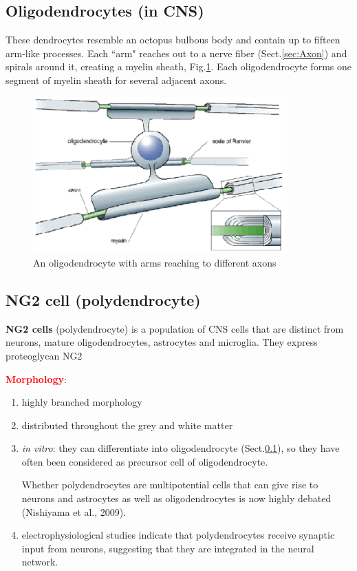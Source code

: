 \subsection{Oligodendrocytes (in CNS)}
\label{sec:oligodendrocytes}

These dendrocytes resemble an octopus bulbous body and contain up to fifteen
arm-like processes. Each ``arm" reaches out to a nerve fiber
(Sect.\ref{sec:Axon}) and spirals around it, creating a myelin sheath,
Fig.\ref{fig:oligodendrocytes}. Each oligodendrocyte forms one segment of myelin
sheath for several adjacent axons.

\begin{figure}[htb]
  \centerline{\includegraphics[height=6cm]{./images/oligodendrocyte.eps}}
  \caption{An oligodendrocyte with arms reaching to
  different axons}\label{fig:oligodendrocytes}
\end{figure}

\subsection{NG2 cell (polydendrocyte)}
\label{sec:NG2-cell}
\label{sec:polydendrocyte}

{\bf NG2 cells} (polydendrocyte) is a population of CNS cells that are distinct
from neurons, mature oligodendrocytes, astrocytes and microglia.
They express proteoglycan NG2

\textcolor{red}{\bf Morphology}:
\begin{enumerate}
  \item highly branched morphology
  
  \item distributed throughout the grey and white matter
  
  \item {\it in vitro}: they can differentiate into oligodendrocyte
  (Sect.\ref{sec:oligodendrocytes}), so they have often been considered as
  precursor cell of oligodendrocyte.
  
  Whether polydendrocytes are multipotential cells that can give rise to neurons
  and astrocytes as well as oligodendrocytes is now highly debated (Nishiyama
  et al., 2009).
  
  \item  electrophysiological studies indicate that polydendrocytes receive
  synaptic input from neurons, suggesting that they are integrated in the neural
  network. 
\end{enumerate}


